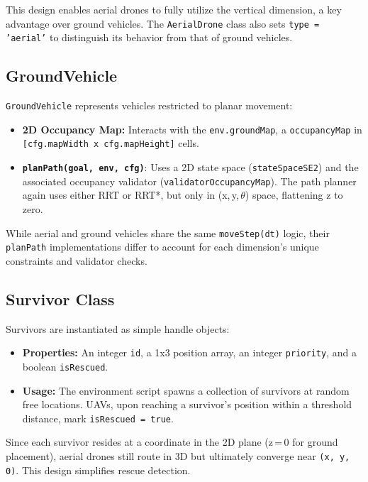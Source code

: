 \documentclass[12pt,a4paper]{report}
\begin{document}
This design enables aerial drones to fully utilize the vertical dimension, a key advantage 
over ground vehicles. The \texttt{AerialDrone} class also sets \texttt{type = 'aerial'} 
to distinguish its behavior from that of ground vehicles.

\subsection{GroundVehicle}
\label{sec:ground_vehicle}
\texttt{GroundVehicle} represents vehicles restricted to planar movement:

\begin{itemize}
    \item \textbf{2D Occupancy Map:}
          Interacts with the \texttt{env.groundMap}, a \texttt{occupancyMap} in 
          \texttt{[cfg.mapWidth x cfg.mapHeight]} cells.
    \item \textbf{\texttt{planPath(goal, env, cfg)}}:
          Uses a 2D state space (\texttt{stateSpaceSE2}) and the associated occupancy 
          validator (\texttt{validatorOccupancyMap}). The path planner again uses either 
          RRT or RRT*, but only in (x,\,y,\,$\theta$) space, flattening z to zero.
\end{itemize}

While aerial and ground vehicles share the same \texttt{moveStep(dt)} logic, their 
\texttt{planPath} implementations differ to account for each dimension’s unique constraints 
and validator checks.

\subsection{Survivor Class}
\label{sec:survivor_class}
Survivors are instantiated as simple handle objects:

\begin{itemize}
    \item \textbf{Properties:} 
          An integer \texttt{id}, a 1x3 position array, an integer \texttt{priority}, 
          and a boolean \texttt{isRescued}.
    \item \textbf{Usage:}
          The environment script spawns a collection of survivors at random free locations. 
          UAVs, upon reaching a survivor’s position within a threshold distance, mark 
          \texttt{isRescued = true}.
\end{itemize}

Since each survivor resides at a coordinate in the 2D plane (z\,=\,0 for ground placement), 
aerial drones still route in 3D but ultimately converge near \texttt{(x, y, 0)}. This design 
simplifies rescue detection.
\end{document}

